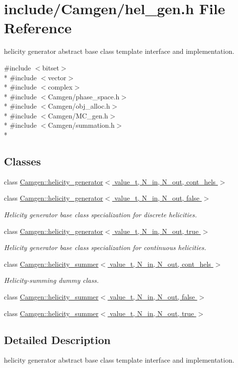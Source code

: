 \hypertarget{a00659}{}\section{include/\+Camgen/hel\+\_\+gen.h File Reference}
\label{a00659}


helicity generator abstract base class template interface and implementation.  


{\ttfamily \#include $<$bitset$>$}\\*
{\ttfamily \#include $<$vector$>$}\\*
{\ttfamily \#include $<$complex$>$}\\*
{\ttfamily \#include $<$Camgen/phase\+\_\+space.\+h$>$}\\*
{\ttfamily \#include $<$Camgen/obj\+\_\+alloc.\+h$>$}\\*
{\ttfamily \#include $<$Camgen/\+M\+C\+\_\+gen.\+h$>$}\\*
{\ttfamily \#include $<$Camgen/summation.\+h$>$}\\*
\subsection*{Classes}
\begin{DoxyCompactItemize}
\item 
class \hyperlink{a00270}{Camgen\+::helicity\+\_\+generator$<$ value\+\_\+t, N\+\_\+in, N\+\_\+out, cont\+\_\+hels $>$}
\item 
class \hyperlink{a00271}{Camgen\+::helicity\+\_\+generator$<$ value\+\_\+t, N\+\_\+in, N\+\_\+out, false $>$}
\begin{DoxyCompactList}\small\item\em Helicity generator base class specialization for discrete helicities. \end{DoxyCompactList}\item 
class \hyperlink{a00272}{Camgen\+::helicity\+\_\+generator$<$ value\+\_\+t, N\+\_\+in, N\+\_\+out, true $>$}
\begin{DoxyCompactList}\small\item\em Helicity generator base class specialization for continuous helicities. \end{DoxyCompactList}\item 
class \hyperlink{a00279}{Camgen\+::helicity\+\_\+summer$<$ value\+\_\+t, N\+\_\+in, N\+\_\+out, cont\+\_\+hels $>$}
\begin{DoxyCompactList}\small\item\em Helicity-\/summing dummy class. \end{DoxyCompactList}\item 
class \hyperlink{a00280}{Camgen\+::helicity\+\_\+summer$<$ value\+\_\+t, N\+\_\+in, N\+\_\+out, false $>$}
\item 
class \hyperlink{a00281}{Camgen\+::helicity\+\_\+summer$<$ value\+\_\+t, N\+\_\+in, N\+\_\+out, true $>$}
\end{DoxyCompactItemize}


\subsection{Detailed Description}
helicity generator abstract base class template interface and implementation. 

